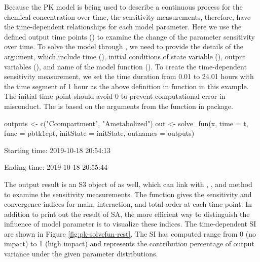 Because the PK model is being used to describe a continuous process for
the chemical concentration over time, the sensitivity measurements,
therefore, have the time-dependent relationships for each model
parameter. Here we use the defined output time points () to
examine the change of the parameter sensitivity over time. To solve the
model through , we need to provide the details of the
argument, which include time (), initial conditions of state
variable (), output variables (), and
name of the model function (). To create the time-dependent
sensitivity measurement, we set the time duration from 0.01 to 24.01
hours with the time segment of 1 hour as the above definition in
 function in this example. The initial time point should avoid
0 to prevent computational error in misconduct. The  is
based on the arguments from the  function in 
package.

\begin{Schunk}
\begin{Sinput}
outputs <- c("Ccompartment", "Ametabolized")
out <- solve_fun(x, time = t, func = pbtk1cpt, 
                 initState = initState, outnames = outputs)
\end{Sinput}
\begin{Soutput}
  Starting time: 2019-10-18 20:54:13
\end{Soutput}
\begin{Soutput}
  Ending time: 2019-10-18 20:55:44
\end{Soutput}
\end{Schunk}

The output result  is an S3 object of  as well,
which can link with , , and  method
to examine the sensitivity measurements. The  function gives
the sensitivity and convergence indices for main, interaction, and total
order at each time point. In addition to print out the result of SA, the
more efficient way to distinguish the influence of model parameter is to
visualize these indices. The time-dependent SI are shown in Figure
\ref{fig:pk-solvefun-rest}. The SI has computed range from 0 (no impact)
to 1 (high impact) and represents the contribution percentage of output
variance under the given parameter distributions.

